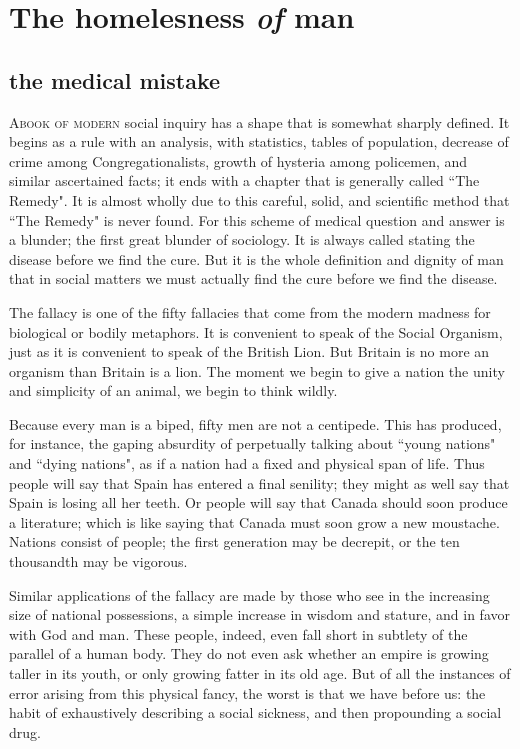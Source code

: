 \documentclass[final,10pt,letterpaper,twocolumn,openany]{book}
\newcommand{\dcap}[2]{
	 \lettrine[nindent=0em,findent=2pt,lines=3,loversize=.15,lraise=0]{#1}{#2}
 }
\begin{document}
\chapter{ The homelesness \textit{of} man }
\section{the medical mistake}
     \dcap{A}{book of modern}social inquiry has a shape that is somewhat sharply
defined. It begins as a rule with an analysis, with statistics, tables of
population, decrease of crime among Congregationalists, growth of
hysteria among policemen, and similar ascertained facts; it ends with a
chapter that is generally called ``The Remedy". It is almost wholly due to
this careful, solid, and scientific method that ``The Remedy" is never found.
For this scheme of medical question and answer is a blunder; the first
great blunder of sociology. It is always called stating the disease before we
find the cure. But it is the whole definition and dignity of man that in
social matters we must actually find the cure before we find the disease.

The fallacy is one of the fifty fallacies that come from the modern
madness for biological or bodily metaphors. It is convenient to speak of
the Social Organism, just as it is convenient to speak of the British Lion.
But Britain is no more an organism than Britain is a lion. The moment we
begin to give a nation the unity and simplicity of an animal, we begin to
think wildly. 

Because every man is a biped, fifty men are not a centipede.
This has produced, for instance, the gaping absurdity of perpetually
talking about ``young nations" and ``dying nations", as if a nation had a
fixed and physical span of life. Thus people will say that Spain has entered
a final senility; they might as well say that Spain is losing all her teeth. Or
people will say that Canada should soon produce a literature; which is like
saying that Canada must soon grow a new moustache. Nations consist of
people; the first generation may be decrepit, or the ten thousandth may be
vigorous.

 Similar applications of the fallacy are made by those who see in
the increasing size of national possessions, a simple increase in wisdom
and stature, and in favor with God and man. These people, indeed, even
fall short in subtlety of the parallel of a human body. They do not even ask
whether an empire is growing taller in its youth, or only growing fatter in
its old age. But of all the instances of error arising from this physical fancy,
the worst is that we have before us: the habit of exhaustively describing a
social sickness, and then propounding a social drug.
\end{document}
